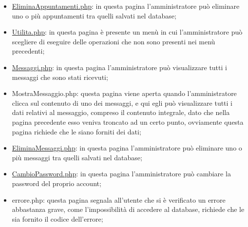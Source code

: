{\begin{itemize}
		\item \href{http://tecweb2016.studenti.math.unipd.it/smarches/EliminaAppuntamenti.php}{EliminaAppuntamenti.php}: in questa pagina l'amministratore può eliminare uno o più appuntamenti tra quelli salvati nel database;
		\item \href{http://tecweb2016.studenti.math.unipd.it/smarches/Utilita.php}{Utilita.php}: in questa pagina è presente un menù in cui l'amministratore può scegliere di eseguire delle operazioni che non sono presenti nei menù precedenti;
		\item \href{http://tecweb2016.studenti.math.unipd.it/smarches/Messaggi.php}{Messaggi.php}: in questa pagina l'amministratore può visualizzare tutti i messaggi che sono stati ricevuti;
		\item MostraMessaggio.php: questa pagina viene aperta quando l'amministratore clicca sul contenuto di uno dei messaggi, e qui egli può visualizzare tutti i dati relativi al messaggio, compreso il contenuto integrale, dato che nella pagina precedente esso veniva troncato ad un certo punto, ovviamente questa pagina richiede che le siano forniti dei dati;
		\item \href{http://tecweb2016.studenti.math.unipd.it/smarches/EliminaMessaggi.php}{EliminaMessaggi.php}: in questa pagina l'amministratore può eliminare uno o più messaggi tra quelli salvati nel database;
		\item \href{http://tecweb2016.studenti.math.unipd.it/smarches/CambioPassword.php}{CambioPassword.php}: in questa pagina l'amministratore può cambiare la password del proprio account;
		\item errore.php: questa pagina segnala all'utente che si è verificato un errore abbastanza grave, come l'impossibilità di accedere al database, richiede che le sia fornito il codice dell'errore;
	\end{itemize}
}